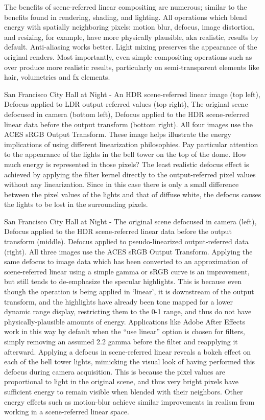 The benefits of scene-referred linear compositing are numerous; similar to the benefits found in rendering, shading, and lighting. All operations which blend energy with spatially neighboring pixels: motion blur, defocus, image distortion, and resizing, for example, have more physically plausible, aka realistic, results by default. Anti-aliasing works better. Light mixing preserves the appearance of the original renders. Most importantly, even simple compositing operations such as over produce more realistic results, particularly on semi-transparent elements like hair, volumetrics and fx elements.


San Francisco City Hall at Night - An HDR scene-referred linear image (top left), Defocus applied to LDR output-referred values (top right), The original scene defocused in camera (bottom left), Defocus applied to the HDR scene-referred linear data before the output transform (bottom right). All four images use the ACES sRGB Output Transform.
These image helps illustrate the energy implications of using different linearization philosophies. Pay particular attention to the appearance of the lights in the bell tower on the top of the dome. How much energy is represented in those pixels? The least realistic defocus effect is achieved by applying the filter kernel directly to the output-referred pixel values without any linearization. Since in this case there is only a small difference between the pixel values of the lights and that of diffuse white, the defocus causes the lights to be lost in the surrounding pixels.


San Francisco City Hall at Night - The original scene defocused in camera (left), Defocus applied to the HDR scene-referred linear data before the output transform (middle). Defocus applied to pseudo-linearized output-referred data (right). All three images use the ACES sRGB Output Transform.
Applying the same defocus to image data which has been converted to an approximation of scene-referred linear using a simple gamma or sRGB curve is an improvement, but still tends to de-emphasize the specular highlights. This is because even though the operation is being applied in ‘linear’, it is downstream of the output transform, and the highlights have already been tone mapped for a lower dynamic range display, restricting them to the 0-1 range, and thus do not have physically-plausible amounts of energy. Applications like Adobe After Effects work in this way by default when the “use linear” option is chosen for filters, simply removing an assumed 2.2 gamma before the filter and reapplying it afterward. Applying a defocus in scene-referred linear reveals a bokeh effect on each of the bell tower lights, mimicking the visual look of having performed this defocus during camera acquisition. This is because the pixel values are proportional to light in the original scene, and thus very bright pixels have sufficient energy to remain visible when blended with their neighbors. Other energy effects such as motion-blur achieve similar improvements in realism from working in a scene-referred linear space.

